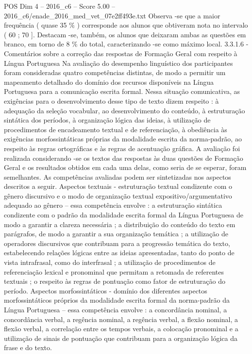 \begin{textsample}{POS Dim 4 – 2016\_c6 – Score 5.00 – 2016\_c6/enade\_2016\_med\_vet\_07e2ff493e.txt}
Observa -se que a maior frequência ( quase 35 \% ) corresponde aos alunos que obtiveram nota no intervalo ( 60 ; 70 ].
Destacam -se, também, os alunos que deixaram ambas as questões em branco, em torno de 8 \% do total, caracterizando -se como máximo local. 3.3.1.6 - Comentários sobre a correção das respostas de Formação Geral com respeito à Língua Portuguesa Na avaliação do desempenho linguístico dos participantes foram consideradas quatro competências distintas, de modo a permitir um mapeamento detalhado do domínio dos recursos disponíveis na Língua Portuguesa para a comunicação escrita formal.
Nessa situação comunicativa, as exigências para o desenvolvimento desse tipo de texto dizem respeito : à adequação da seleção vocabular, ao desenvolvimento do conteúdo, à estruturação sintática dos períodos, à organização lógica das ideias, à utilização de procedimentos de encadeamento textual e de referenciação, à obediência às exigências morfossintáticas próprias da modalidade escrita da norma-padrão, ao respeito às regras ortográficas e às regras de acentuação gráfica.
A avaliação foi realizada considerando -se os textos das respostas às duas questões de Formação Geral e os resultados obtidos em cada uma delas, como seria de se esperar, foram semelhantes.
As competências avaliadas podem ser sintetizadas nos aspectos descritos a seguir.
Aspectos textuais - estruturação textual condizente com o gênero discursivo e o modo de organização textual expositivo/argumentativo adequado ao gênero – essa competência envolve : a estruturação sintática condizente com o padrão da modalidade escrita formal da Língua Portuguesa de modo a garantir a clareza necessária ; a distribuição do conteúdo do texto em parágrafos, de modo a garantir a sua organização temática ; a utilização de operadores discursivos que contribuam para a progressão temática do texto, estabelecendo relações lógicas entre as ideias apresentadas, tanto do ponto de vista intrafrasal, como do interfrasal ; a utilização de procedimentos de referenciação lexical e pronominal que permitam a retomada de referentes textuais ; o respeito às regras de pontuação como fator de estruturação do período.
Aspectos morfossintáticos - domínio dos diferentes aspectos morfossintáticos próprios da modalidade escrita formal da norma-padrão da Língua Portuguesa – essa competência envolve : a concordância nominal, a concordância verbal, a regência nominal, a regência verbal, a flexão nominal, a flexão verbal, a correlação entre os tempos verbais, a colocação pronominal e a utilização de sinais de pontuação que contribuam para a organização lógica da frase e do texto.

\end{textsample}

